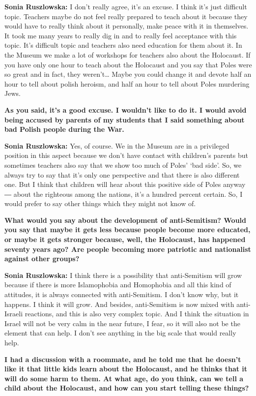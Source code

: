 \textbf{Sonia Ruszlowska:} I don’t really agree, it’s an excuse. I think it’s just difficult topic. Teachers maybe do not feel really prepared to teach about it because they would have to really think about it personally, make peace with it in themselves. It took me many years to really dig in and to really feel acceptance with this topic. It’s difficult topic and teachers also need education for them about it. In the Museum we make a lot of workshops for teachers also about the Holocaust. If you have only one hour to teach about the Holocaust and you say that Poles were so great and in fact, they weren’t… Maybe you could change it and devote half an hour to tell about polish heroism, and half an hour to tell about Poles murdering Jews. 

\textbf{ As you said, it’s a good excuse. I wouldn’t like to do it. I would avoid being accused by parents of my students that I said something about bad Polish people during the War.} 

\textbf{Sonia Ruszlowska:} Yes, of course. We in the Museum are in a privileged position in this aspect because we don’t have contact with children’s parents but sometimes teachers also say that we show too much of Poles’ ‘bad side’. So, we always try to say that it’s only one perspective and that there is also different one. But I think that children will hear about this positive side of Poles anyway ― about the righteous among the nations, it’s a hundred percent certain. So, I would prefer to say other things which they might not know of. 

\textbf{What would you say about the development of anti-Semitism? Would you say that maybe it gets less because people become more educated, or maybe it gets stronger because, well, the Holocaust, has happened seventy years ago? Are people becoming more patriotic and nationalist against other groups?} 

\textbf{Sonia Ruszlowska:} I think there is a possibility that anti-Semitism will grow because if there is more Islamophobia and Homophobia and all this kind of attitudes, it is always connected with anti-Semitism. I don’t know why, but it happens. I think it will grow. And besides, anti-Semitism is now mixed with anti-Israeli reactions, and this is also very complex topic. And I think the situation in Israel will not be very calm in the near future, I fear, so it will also not be the element that can help. I don’t see anything in the big scale that would really help. 
 
\textbf{I had a discussion with a roommate, and he told me that he doesn’t like it that little kids learn about the Holocaust, and he thinks that it will do some harm to them. At what age, do you think, can we tell a child about the Holocaust, and how can you start telling these things?} 

